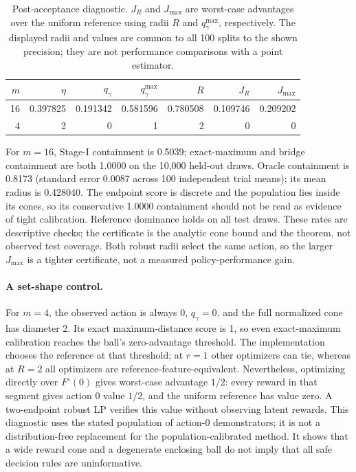 \begin{table}[h]
\centering
\small
\caption{Post-acceptance diagnostic. $J_R$ and $J_{\max}$ are worst-case
advantages over the uniform reference using radii $R$ and $q_\gamma^{\max}$,
respectively. The displayed radii and values are common to all 100 splits to
the shown precision; they are not performance comparisons with a point estimator.}
\label{tab:exact-toy}
\begin{tabular}{@{}rrrrrrr@{}}
\toprule
$m$ & $\eta$ & $q_\gamma$ & $q_\gamma^{\max}$ & $R$ & $J_R$ & $J_{\max}$ \\
\midrule
16 & 0.397825 & 0.191342 & 0.581596 & 0.780508 & 0.109746 & 0.209202 \\
4 & 2 & 0 & 1 & 2 & 0 & 0 \\
\bottomrule
\end{tabular}
\end{table}

For $m=16$, Stage-I containment is 0.5039; exact-maximum and bridge containment
are both 1.0000 on the 10,000 held-out draws. Oracle containment is 0.8173
(standard error 0.0087 across 100 independent trial means); its mean radius is
0.428040. The endpoint score is discrete and the population lies inside its
cones, so its conservative 1.0000 containment should not be read as evidence
of tight calibration. Reference dominance holds on all test draws. These
rates are descriptive checks; the certificate is the analytic cone bound and
the theorem, not observed test coverage. Both robust radii select the same
action, so the larger $J_{\max}$ is a tighter certificate, not a measured
policy-performance gain.

\paragraph{A set-shape control.}
For $m=4$, the observed action is always 0, $q_\gamma=0$, and the full
normalized cone has diameter 2. Its exact maximum-distance score is 1, so
even exact-maximum calibration reaches the ball's zero-advantage threshold.
The implementation chooses the reference at that threshold; at $r=1$ other
optimizers can tie, whereas at $R=2$ all optimizers are reference-feature-equivalent.
Nevertheless, optimizing directly over $F^\circ(0)$ gives worst-case advantage
$1/2$: every reward in that segment gives action 0 value $1/2$, and the uniform
reference has value zero. A two-endpoint robust LP verifies this value without
observing latent rewards. This diagnostic uses the stated population of
action-0 demonstrators; it is not a distribution-free replacement for the
population-calibrated method. It shows that a wide reward cone and a degenerate
enclosing ball do not imply that all safe decision rules are uninformative.

